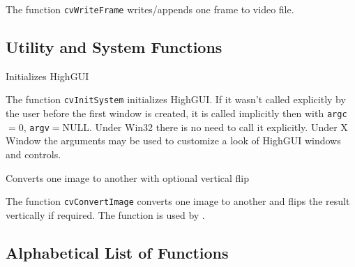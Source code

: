 The function \texttt{cvWriteFrame} writes/appends one frame to video file.

\subsection{Utility and System Functions}


Initializes HighGUI


\begin{description}
\end{description}

The function \texttt{cvInitSystem} initializes HighGUI. If it wasn't called explicitly by the user before the first window is created, it is called implicitly then with \texttt{argc}$=0$, \texttt{argv}$=$NULL. Under Win32 there is no need to call it explicitly. Under X Window the arguments may be used to customize a look of HighGUI windows and controls.


Converts one image to another with optional vertical flip


\begin{description}
\end{description}

The function \texttt{cvConvertImage} converts one image to another and flips the result vertically if required. The function is used by .

\subsection{Alphabetical List of Functions}

